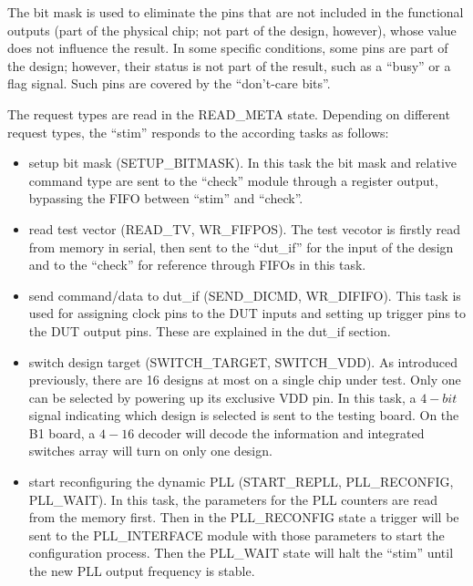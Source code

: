 The bit mask is used to eliminate the pins that are not included in the functional outputs (part of the physical chip; not part of the design, however), whose value does not influence the result. In some specific conditions, some pins are part of the design; however, their status is not part of the result, such as a ``busy'' or a flag signal. Such pins are covered by the ``don't-care bits''.


The request types are read in the READ\_META state. Depending on different request types, the ``stim'' responds to the according tasks as follows:

\begin{itemize}
 \item setup bit mask (SETUP\_BITMASK). In this task the bit mask and relative command type are sent to the ``check'' module through a register output, bypassing the FIFO between ``stim'' and ``check''.

 \item read test vector (READ\_TV, WR\_FIFPOS). The test vecotor is firstly read from memory in serial, then sent to the ``dut\_if'' for the input of the design and to the ``check'' for reference through FIFOs in this task.

 \item send command/data to dut\_if (SEND\_DICMD, WR\_DIFIFO). This task is used for assigning clock pins to the DUT inputs and setting up trigger pins to the DUT output pins. These are explained in the dut\_if section.

 \item switch design target (SWITCH\_TARGET, SWITCH\_VDD). As introduced previously, there are 16 designs at most on a single chip under test. Only one can be selected by powering up its exclusive VDD pin. In this task, a $4-bit$ signal indicating which design is selected is sent to the testing board. On the B1 board, a $4-16$ decoder will decode the information and integrated switches array will turn on only one design.

 \item start reconfiguring the dynamic PLL (START\_REPLL, PLL\_RECONFIG, PLL\_WAIT). In this task, the parameters for the PLL counters are read from the memory first. Then in the PLL\_RECONFIG state a trigger will be sent to the PLL\_INTERFACE module with those parameters to start the configuration process. Then the PLL\_WAIT state will halt the ``stim'' until the new PLL output frequency is stable.
\end{itemize}

